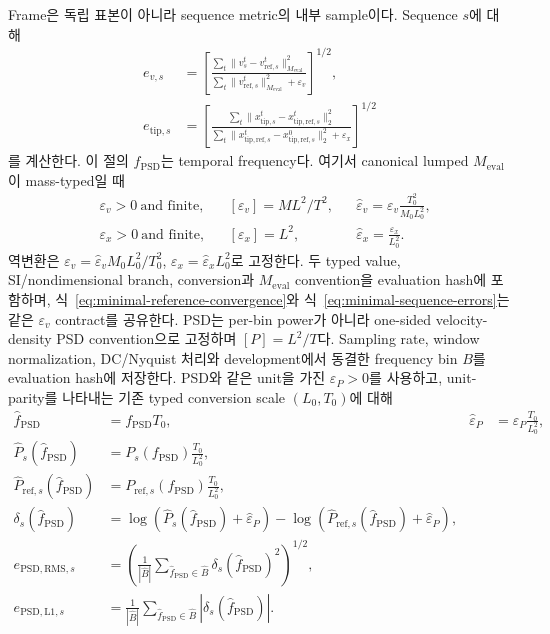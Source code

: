 \documentclass[11pt]{article}
\begin{document}
Frame은 독립 표본이 아니라 sequence metric의 내부 sample이다. Sequence \(s\)에 대해
\begin{equation}
\begin{aligned}
  e_{v,s}
  &=
  \left[
  \frac{\sum_t\|v_s^t-v_{\mathrm{ref},s}^t\|_{M_{\mathrm{eval}}}^2}
       {\sum_t\|v_{\mathrm{ref},s}^t\|_{M_{\mathrm{eval}}}^2+\varepsilon_v}
  \right]^{1/2},\\
  e_{\mathrm{tip},s}
  &=
  \left[
  \frac{\sum_t\|x_{\mathrm{tip},s}^t-x_{\mathrm{tip,ref},s}^t\|_2^2}
       {\sum_t\|x_{\mathrm{tip,ref},s}^t-x_{\mathrm{tip,ref},s}^0\|_2^2
        +\varepsilon_x}
  \right]^{1/2}
\end{aligned}
  \label{eq:minimal-sequence-errors}
\end{equation}
를 계산한다. 이 절의 \(f_{\mathrm{PSD}}\)는 temporal frequency다.
여기서 canonical lumped \(M_{\mathrm{eval}}\)이 mass-typed일 때
\[
\begin{aligned}
  &\varepsilon_v>0\ \text{and finite},
  &&[\varepsilon_v]=ML^2/T^2,
  &&\widehat\varepsilon_v
    =\varepsilon_v\frac{T_0^2}{M_0L_0^2},\\
  &\varepsilon_x>0\ \text{and finite},
  &&[\varepsilon_x]=L^2,
  &&\widehat\varepsilon_x=\frac{\varepsilon_x}{L_0^2}.
\end{aligned}
\]
역변환은
\(\varepsilon_v=\widehat\varepsilon_vM_0L_0^2/T_0^2\),
\(\varepsilon_x=\widehat\varepsilon_xL_0^2\)로 고정한다.
두 typed value, SI/nondimensional branch, conversion과 \(M_{\mathrm{eval}}\) convention을
evaluation hash에 포함하며, 식~\eqref{eq:minimal-reference-convergence}와
식~\eqref{eq:minimal-sequence-errors}는 같은 \(\varepsilon_v\) contract를 공유한다.
PSD는 per-bin power가 아니라 one-sided velocity-density PSD convention으로 고정하며
\([P]=L^2/T\)다. Sampling rate, window normalization, DC/Nyquist 처리와 development에서 동결한
frequency bin \(B\)를 evaluation hash에 저장한다. PSD와 같은 unit을 가진
\(\varepsilon_P>0\)를 사용하고, unit-parity를 나타내는 기존 typed conversion scale
\((L_0,T_0)\)에 대해
\begin{equation}
\begin{aligned}
  \widehat f_{\mathrm{PSD}}&=f_{\mathrm{PSD}}T_0,&
  \widehat\varepsilon_P&=\varepsilon_P\frac{T_0}{L_0^2},\\
  \widehat P_s(\widehat f_{\mathrm{PSD}})
  &=P_s(f_{\mathrm{PSD}})\frac{T_0}{L_0^2},\\
  \widehat P_{\mathrm{ref},s}(\widehat f_{\mathrm{PSD}})
  &=P_{\mathrm{ref},s}(f_{\mathrm{PSD}})\frac{T_0}{L_0^2},\\
  \delta_s(\widehat f_{\mathrm{PSD}})
  &=\log\!\left(\widehat P_s(\widehat f_{\mathrm{PSD}})+\widehat\varepsilon_P\right)
    -\log\!\left(\widehat P_{\mathrm{ref},s}(\widehat f_{\mathrm{PSD}})+\widehat\varepsilon_P\right),\\
  e_{\mathrm{PSD,RMS},s}
  &=\left(\frac{1}{|\widehat B|}
    \sum_{\widehat f_{\mathrm{PSD}}\in\widehat B}
    \delta_s(\widehat f_{\mathrm{PSD}})^2\right)^{1/2},\\
  e_{\mathrm{PSD,L1},s}
  &=\frac{1}{|\widehat B|}
    \sum_{\widehat f_{\mathrm{PSD}}\in\widehat B}
    |\delta_s(\widehat f_{\mathrm{PSD}})|.
\end{aligned}
  \label{eq:minimal-log-psd-errors}
\end{equation}
\end{document}
